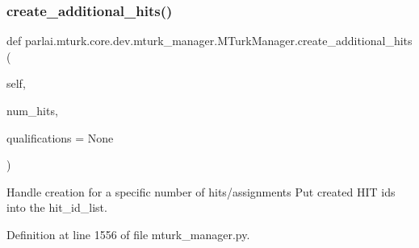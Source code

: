 \subsubsection{\texorpdfstring{create\+\_\+additional\+\_\+hits()}{create\_additional\_hits()}}
{\footnotesize\ttfamily def parlai.\+mturk.\+core.\+dev.\+mturk\+\_\+manager.\+M\+Turk\+Manager.\+create\+\_\+additional\+\_\+hits (\begin{DoxyParamCaption}\item[{}]{self,  }\item[{}]{num\+\_\+hits,  }\item[{}]{qualifications = {\ttfamily None} }\end{DoxyParamCaption})}

\begin{DoxyVerb}Handle creation for a specific number of hits/assignments Put created HIT ids
into the hit_id_list.
\end{DoxyVerb}
 

Definition at line 1556 of file mturk\+\_\+manager.\+py.


